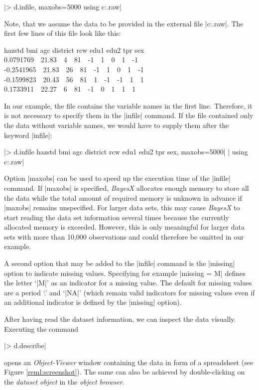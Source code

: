 |> d.infile, maxobs=5000 using c:\data\zambia.raw|

Note, that we assume the data to be provided in the external file |c:\data\zambia.raw|. The first few lines of this file look
like this:

{\footnotesize
 hazstd bmi agc district rcw edu1 edu2 tpr sex\\
 0.0791769 \,\, 21.83 \,\, 4 \,\, 81 \,\, -1 \,\, 1 \,\, 0 \,\, 1 \,\, -1\\
 -0.2541965 \,\, 21.83 \,\, 26 \,\, 81 \,\, -1 \,\, 1 \,\, 0 \,\, 1 \,\, -1\\
 -0.1599823 \,\, 20.43 \,\, 56 \,\, 81 \,\, 1 \,\, -1 \,\, -1 \,\, 1 \,\, 1\\
 0.1733911 \,\, 22.27 \,\, 6 \,\, 81 \,\, -1 \,\, 0 \,\, 1 \,\, 1 \,\, 1}

In our example, the file contains the variable names in the first line. Therefore, it is not necessary to specify them in the
|infile| command. If the file contained only the data without variable names, we would have to supply them after the keyword
|infile|:

 |> d.infile hazstd bmi agc district rcw edu1 edu2 tpr sex, maxobs=5000|
 |  using c:\data\zambia.raw|

Option |maxobs| can be used to speed up the execution time of the |infile| command. If |maxobs| is specified, {\it BayesX}
allocates enough memory to store all the data while the total amount of required memory is unknown in advance if |maxobs|
remains unspecified. For larger data sets, this may cause {\it BayesX} to start reading the data set information several times
because the currently allocated memory is exceeded. However, this is only meaningful for larger data sets with more than 10,000
observations and could therefore be omitted in our example.

A second option that may be added to the |infile| command is the |missing| option to indicate missing values. Specifying for
example |missing = M| defines the letter `|M|' as an indicator for a missing value. The default for missing values are a period
`.' and `|NA|' (which remain valid indicators for missing values even if an additional indicator is defined by the |missing|
option).

After having read the dataset information, we can inspect the data visually. Executing the command

|> d.describe|

opens an {\it Object-Viewer} window containing the data in form of a spreadsheet (see Figure \ref{reml:screenshot}). The same
can also be achieved by double-clicking on the {\it dataset object} in the {\it object browser}.

